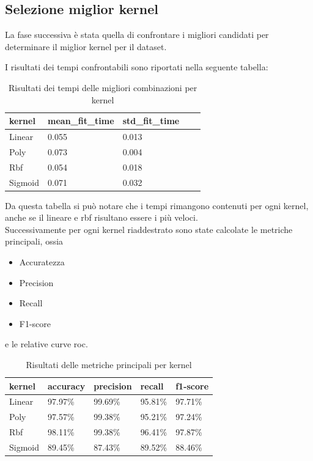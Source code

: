 \subsection{Selezione miglior kernel}
    La fase successiva è stata quella di confrontare i migliori candidati per
    determinare il miglior kernel per il dataset.
    
    I risultati dei tempi confrontabili sono riportati nella seguente tabella:

    \begin{table}[!ht]
        \centering
        \begin{tabular}{|l|l|l|l|l|}
        \hline
            \textbf{kernel} & \textbf{mean\_fit\_time} & \textbf{std\_fit\_time} \\ \hline
            Linear & 0.055 & 0.013  \\ \hline
            Poly & 0.073 & 0.004  \\ \hline
            Rbf & 0.054 & 0.018  \\ \hline
            Sigmoid & 0.071 & 0.032  \\ \hline
        \end{tabular}
        \caption{Risultati dei tempi delle migliori combinazioni per kernel}
        \label{tab:top_time_kernels_corr}
    \end{table}

    Da questa tabella si può notare che i tempi rimangono contenuti per ogni kernel,
    anche se il lineare e rbf risultano essere i più veloci.\\

    Successivamente per ogni kernel riaddestrato sono state calcolate 
    le metriche principali, ossia
    \begin{itemize}
        \item Accuratezza
        \item Precision
        \item Recall
        \item F1-score
    \end{itemize}
    e le relative curve roc.

    \begin{table}[!ht]
        \centering
        \begin{tabular}{|l|l|l|l|l|}
        \hline
            \textbf{kernel} & \textbf{accuracy} & \textbf{precision} & \textbf{recall} & \textbf{f1-score} \\ \hline
            Linear & 97.97\% & 99.69\% & 95.81\% & 97.71\%  \\ \hline
            Poly & 97.57\% & 99.38\% & 95.21\% & 97.24\%  \\ \hline
            Rbf & 98.11\% & 99.38\% & 96.41\% & 97.87\%  \\ \hline
            Sigmoid & 89.45\% & 87.43\% & 89.52\% & 88.46\%  \\ \hline
        \end{tabular}
        \caption{Risultati delle metriche principali per kernel}
        \label{tab:top_metrics_kernels_corr}
    \end{table}

